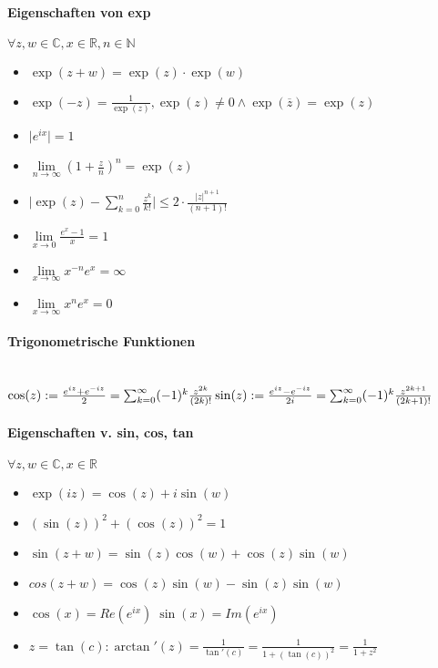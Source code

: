 \documentclass[paper=a3,paper=landscape, fontsize=9pt,DIV=25]{scrartcl}
\newcommand{\real}{{\mathbb{R}}}
\newcommand{\compl}{\mathbb{C}}
\newcommand{\nat}{\mathbb{N}}
\begin{document}
\begin{multicols*}{4}
  \paragraph{Eigenschaften von exp}
  $\forall z,w \in \compl, x \in \real, n \in \nat$
  \begin{itemize}
  \item $\exp(z+w)=\exp(z)\cdot \exp(w)$
  \item $\exp(-z)=\frac{1}{\exp(z)}, \exp(z) \neq 0 \wedge \exp(\overline{z})=\exp(z)$
  \item $\lvert e^{ix} \rvert = 1$
  \item $\lim\limits_{n \rightarrow \infty} (1+\frac{z}{n})^n=\exp(z)$
  \item $ \lvert \exp(z)- \sum_{k=0}^{n} \frac{z^k}{k!} \rvert \leq 2 \cdot \frac{\lvert z \rvert ^{n+1}}{(n+1)!}$
  \item $ \lim\limits_{x \rightarrow 0} \frac{e^x-1}{x} = 1$
  \item $ \lim\limits_{x \rightarrow \infty} x^{-n}e^x=\infty$
  \item $ \lim\limits_{x \rightarrow \infty} x^ne^x=0$
  \end{itemize}


  \paragraph{Trigonometrische Funktionen}\hspace{0pt} \\
  $  \cos(z):=\frac{e^{iz}+e^{-iz}}{2} = \sum_{k=0}^{\infty} (-1)^k\frac{z^{2k}}{(2k)!}\\\sin(z):=\frac{e^{iz}-e^{-iz}}{2i} = \sum_{k=0}^{\infty} (-1)^k \frac{z^{2k+1}}{(2k+1)!}$


  \paragraph{Eigenschaften v. sin, cos, tan}
  $\forall z,w \in \compl, x \in \real$

  \begin{itemize}
  \item $\exp(iz) = \cos(z)+i\sin(w)$
  \item $(\sin(z))^2+(\cos(z))^2=1$
  \item $\sin(z+w)=\sin(z)\cos(w)+\cos(z)\sin(w)$
  \item $cos(z+w)=\cos(z)\sin(w)-\sin(z)\sin(w)$
  \item $\cos(x)=Re(e^{ix}) \; \sin(x)=Im(e^{ix})$
  \item $z=\tan(c): \arctan'(z)=\frac{1}{\tan'(c)}=\frac{1}{1+(\tan(c))^2}=\frac{1}{1+z^2}$
  \end{itemize}


\end{multicols*}
\end{document}
